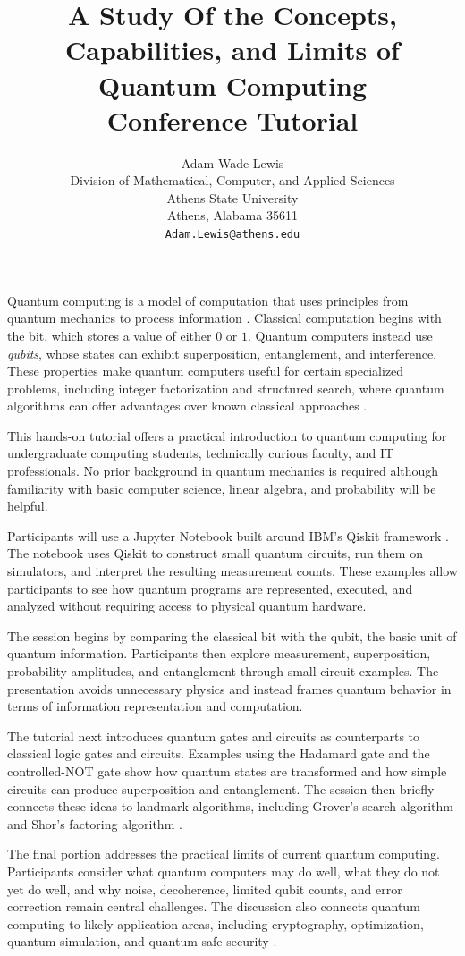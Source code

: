 \documentclass{article}
\title{A Study Of the Concepts, Capabilities, and Limits of Quantum Computing\\
\vspace{0.2in}
\large Conference Tutorial}
\author{
  Adam Wade Lewis\\
  Division of Mathematical, Computer, and Applied Sciences\\
  Athens State University\\
  Athens, Alabama 35611\\
  \texttt{Adam.Lewis@athens.edu}
}
\date{}
\begin{document}
\maketitle

Quantum computing is a model of computation that uses principles from
quantum mechanics to process information \cite{kaye_laflamme_mosca_2007}.
Classical computation begins with the bit, which stores a value of either
$0$ or $1$. Quantum computers instead use \textit{qubits}, whose states can
exhibit superposition, entanglement, and interference. These properties make
quantum computers useful for certain specialized problems, including integer
factorization and structured search, where quantum algorithms can offer
advantages over known classical approaches \cite{nielsen_chuang_2010}.

This hands-on tutorial offers a practical introduction to quantum computing
for undergraduate computing students, technically curious faculty, and IT
professionals. No prior background in quantum mechanics is required although
familiarity with basic computer science, linear algebra, and
probability will be helpful.

Participants will use a Jupyter Notebook \cite{Kluyver2016aa} built around
IBM's Qiskit framework \cite{qiskit_docs_2026,javadi_abhari_qiskit_2024}.
The notebook uses Qiskit to construct small quantum circuits, run them on
simulators, and interpret the resulting measurement counts. These examples
allow participants to see how quantum programs are represented, executed, and
analyzed without requiring access to physical quantum hardware.

The session begins by comparing the classical bit with the qubit, the basic
unit of quantum information. Participants then explore measurement,
superposition, probability amplitudes, and entanglement through small circuit
examples. The presentation avoids unnecessary physics and instead frames
quantum behavior in terms of information representation and computation.

The tutorial next introduces quantum gates and circuits as counterparts to
classical logic gates and circuits. Examples using the Hadamard gate and the
controlled-NOT gate show how quantum states are transformed and how simple
circuits can produce superposition and entanglement. The session then briefly
connects these ideas to landmark algorithms, including Grover's search
algorithm \cite{grover_1996} and Shor's factoring algorithm \cite{shor_1994}.

The final portion addresses the practical limits of current quantum
computing. Participants consider what quantum computers may do well, what
they do not yet do well, and why noise, decoherence, limited qubit counts,
and error correction remain central challenges. The discussion also connects
quantum computing to likely application areas, including cryptography,
optimization, quantum simulation, and quantum-safe security
\cite{nist_pqc_standards_2024}.
\end{document}
